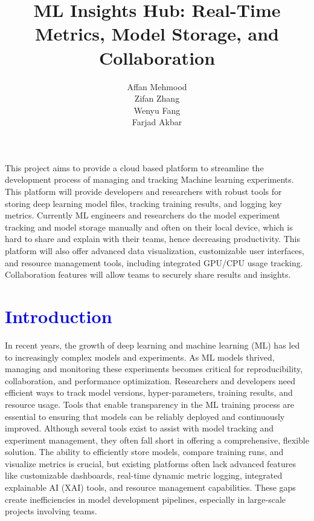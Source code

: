 \documentclass[12pt]{article}
\newcommand{\tb}{\textcolor{blue}}
\begin{document}
\title{ML Insights Hub: Real-Time Metrics, Model Storage, and Collaboration}


\author{
Affan Mehmood\\
Zifan Zhang\\
Wenyu Fang\\
Farjad Akbar\\
}




\maketitle {}

\abstract This project aims to provide a cloud based platform to streamline the development process of managing and tracking Machine learning experiments. This platform will provide developers and researchers with robust tools for storing deep learning model files, tracking training results, and logging key metrics. Currently ML engineers and researchers do the model experiment tracking and model storage manually and often on their local device, which is hard to share and explain with their teams, hence decreasing productivity. This platform will also offer advanced data visualization, customizable user interfaces, and resource management tools, including integrated GPU/CPU usage tracking. Collaboration features will allow teams to securely share results and insights.

\section{\tb{Introduction}}

In recent years, the growth of deep learning and machine learning (ML) has led to increasingly complex models and experiments. As ML models thrived, managing and monitoring these experiments becomes critical for reproducibility, collaboration, and performance optimization. Researchers and developers need efficient ways to track model versions, hyper-parameters, training results, and resource usage. Tools that enable transparency in the ML training process are essential to ensuring that models can be reliably deployed and continuously improved. 
Although several tools exist to assist with model tracking and experiment management, they often fall short in offering a comprehensive, flexible solution. The ability to efficiently store models, compare training runs, and visualize metrics is crucial, but existing platforms often lack advanced features like customizable dashboards, real-time dynamic metric logging, integrated explainable AI (XAI) tools, and resource management capabilities. These gaps create inefficiencies in model development pipelines, especially in large-scale projects involving teams.
\end{document}

